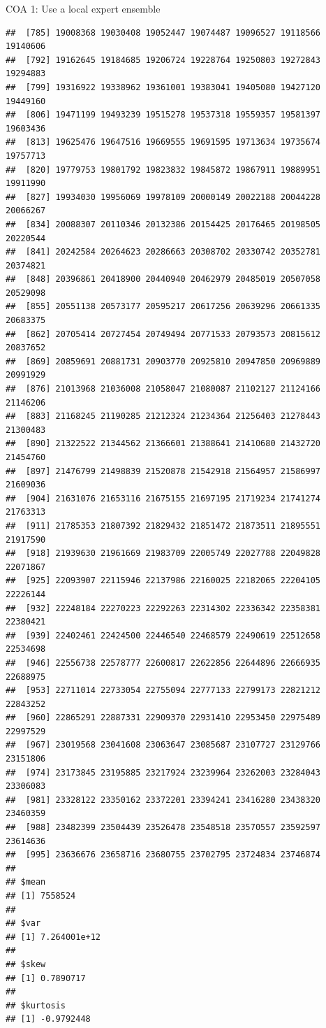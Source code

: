 \documentclass[ignorenonframetext,]{beamer}
\begin{document}
\begin{frame}[fragile]{COA 1: Use a local expert ensemble}
\begin{verbatim}
##  [785] 19008368 19030408 19052447 19074487 19096527 19118566 19140606
##  [792] 19162645 19184685 19206724 19228764 19250803 19272843 19294883
##  [799] 19316922 19338962 19361001 19383041 19405080 19427120 19449160
##  [806] 19471199 19493239 19515278 19537318 19559357 19581397 19603436
##  [813] 19625476 19647516 19669555 19691595 19713634 19735674 19757713
##  [820] 19779753 19801792 19823832 19845872 19867911 19889951 19911990
##  [827] 19934030 19956069 19978109 20000149 20022188 20044228 20066267
##  [834] 20088307 20110346 20132386 20154425 20176465 20198505 20220544
##  [841] 20242584 20264623 20286663 20308702 20330742 20352781 20374821
##  [848] 20396861 20418900 20440940 20462979 20485019 20507058 20529098
##  [855] 20551138 20573177 20595217 20617256 20639296 20661335 20683375
##  [862] 20705414 20727454 20749494 20771533 20793573 20815612 20837652
##  [869] 20859691 20881731 20903770 20925810 20947850 20969889 20991929
##  [876] 21013968 21036008 21058047 21080087 21102127 21124166 21146206
##  [883] 21168245 21190285 21212324 21234364 21256403 21278443 21300483
##  [890] 21322522 21344562 21366601 21388641 21410680 21432720 21454760
##  [897] 21476799 21498839 21520878 21542918 21564957 21586997 21609036
##  [904] 21631076 21653116 21675155 21697195 21719234 21741274 21763313
##  [911] 21785353 21807392 21829432 21851472 21873511 21895551 21917590
##  [918] 21939630 21961669 21983709 22005749 22027788 22049828 22071867
##  [925] 22093907 22115946 22137986 22160025 22182065 22204105 22226144
##  [932] 22248184 22270223 22292263 22314302 22336342 22358381 22380421
##  [939] 22402461 22424500 22446540 22468579 22490619 22512658 22534698
##  [946] 22556738 22578777 22600817 22622856 22644896 22666935 22688975
##  [953] 22711014 22733054 22755094 22777133 22799173 22821212 22843252
##  [960] 22865291 22887331 22909370 22931410 22953450 22975489 22997529
##  [967] 23019568 23041608 23063647 23085687 23107727 23129766 23151806
##  [974] 23173845 23195885 23217924 23239964 23262003 23284043 23306083
##  [981] 23328122 23350162 23372201 23394241 23416280 23438320 23460359
##  [988] 23482399 23504439 23526478 23548518 23570557 23592597 23614636
##  [995] 23636676 23658716 23680755 23702795 23724834 23746874
## 
## $mean
## [1] 7558524
## 
## $var
## [1] 7.264001e+12
## 
## $skew
## [1] 0.7890717
## 
## $kurtosis
## [1] -0.9792448
\end{verbatim}

\end{frame}
\end{document}

